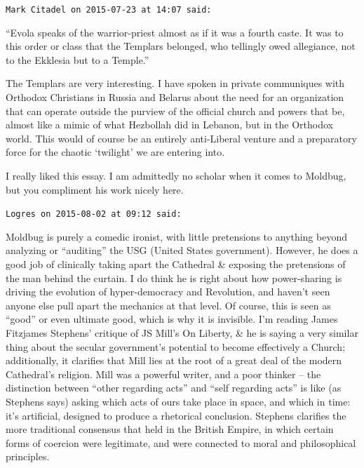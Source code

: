 \begin{footnotesize}
\begin{sffamily}
\texttt{Mark Citadel on 2015-07-23 at 14:07 said:}

``Evola speaks of the warrior-priest almost as if it was a fourth caste. It was to this order or class that the Templars belonged, who tellingly owed allegiance, not to the Ekklesia but to a Temple.''

The Templars are very interesting. I have spoken in private communiques with Orthodox Christians in Russia and Belarus about the need for an organization that can operate outside the purview of the official church and powers that be, almost like a mimic of what Hezbollah did in Lebanon, but in the Orthodox world. This would of course be an entirely anti-Liberal venture and a preparatory force for the chaotic `twilight' we are entering into.

I really liked this essay. I am admittedly no scholar when it comes to Moldbug, but you compliment his work nicely here.

\hfill

\texttt{Logres on 2015-08-02 at 09:12 said:}

Moldbug is purely a comedic ironist, with little pretensions to anything beyond analyzing or ``auditing'' the USG (United States government). However, he does a good job of clinically taking apart the Cathedral \& exposing the pretensions of the man behind the curtain. I do think he is right about how power-sharing is driving the evolution of hyper-democracy and Revolution, and haven't seen anyone else pull apart the mechanics at that level. Of course, this is seen as ``good'' or even ultimate good, which is why it is invisible. I'm reading James Fitzjames Stephens' critique of JS Mill's On Liberty, \& he is saying a very similar thing about the secular government's potential to become effectively a Church; additionally, it clarifies that Mill lies at the root of a great deal of the modern Cathedral's religion. Mill was a powerful writer, and a poor thinker -- the distinction between ``other regarding acts'' and ``self regarding acts'' is like (as Stephens says) asking which acts of ours take place in space, and which in time: it's artificial, designed to produce a rhetorical conclusion. Stephens clarifies the more traditional consensus that held in the British Empire, in which certain forms of coercion were legitimate, and were connected to moral and philosophical principles.


\hfill

\end{sffamily}
\end{footnotesize}

